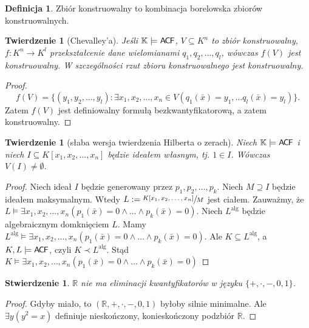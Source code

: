 \documentclass{article}
\newcommand{\R}{\mathbb{R}}
\newcommand{\K}{\mathbb{K}}
\theoremstyle{plain}
\newtheorem{tw}[thm]{Twierdzenie}
\newtheorem{stw}[thm]{Stwierdzenie}
\theoremstyle{definition}
\newtheorem{df}[thm]{Definicja}
\theoremstyle{remark}
\newcommand{\ACF}{\mathsf{A \mkern-2.0mu C \mkern-1.1mu F}}
\begin{document}
\begin{df}
	 Zbiór konstruowalny to kombinacja borelowska zbiorów konstruowalnych.
\end{df}

\begin{tw}[Chevalley'a]
	 Jeśli $\K \models \ACF$, $V \subseteq K^n$ to zbiór konstruowalny,
	 $f \colon K^n \to K^l$ przekształcenie dane wielomianami
	 $q_1, q_2, \ldots, q_l$,
	 wówczas $f(V)$ jest konstruowalny.
	 W szczególności rzut zbioru konstruowalnego jest konstruowalny.
\end{tw}
\begin{proof}
	\[
		f(V) = \{ (y_1, y_2, \ldots, y_l ) \colon \exists x_1, x_2, \ldots, x_n \in V (q_1(\bar{x}) = y_1, \ldots q_l(\bar{x}) = y_l) \}.
	\]
	Zatem $ f(V) $ jest definiowalny formułą bezkwantyfikatorową, a zatem
	konstruowalny.
\end{proof}

\begin{tw}[słaba wersja twierdzenia Hilberta o zerach]
	Niech $\K \models \ACF$ i niech
	$I \subseteq K[x_1, x_2, \ldots, x_n ] $ będzie ideałem własnym, tj.
	$1 \in I$. Wówczas $V(I) \neq \emptyset$.
\end{tw}
\begin{proof}
	Niech ideał $I$ będzie generowany przez $p_1, p_2, \ldots, p_k $.
	Niech $M \supseteq I$ będzie ideałem maksymalnym.
	Wtedy $L := \sfrac{K[x_1, x_2, \ldots, x_n ]}{M} $ jest ciałem.
	Zauważmy, że $L \models \exists x_1, x_2, \ldots, x_n (p_1(\bar{x}) = 0
	\wedge \ldots \wedge p_k(\bar{x}) = 0) $.
	Niech $ L^{\text{alg}} $ będzie algebraicznym domknięciem $ L $.
	Mamy $L^{\text{alg}} \models \exists x_1, x_2, \ldots, x_n
	(p_1(\bar{x}) = 0 \wedge \ldots \wedge p_k(\bar{x}) = 0) $.
	Ale $K \subseteq L^{\text{alg}} $, a $ K , L \models \ACF $, czyli $ K
	\prec L^{\text{alg}} $.
	Stąd $K \models \exists x_1, x_2, \ldots, x_n (p_1(\bar{x}) = 0 \wedge
	\ldots \wedge p_k(\bar{x}) = 0) $
\end{proof}



\begin{stw}
	 $\R$ nie ma eliminacji kwantyfikatorów w języku
	 $\{+, \cdot, -, 0, 1\}$. %
\end{stw}
\begin{proof}
	Gdyby miało, to $ (\R, +, \cdot, -, 0, 1) $ byłoby silnie minimalne.
	Ale $\exists y (y^2 = x) $ definiuje nieskończony, konieskończony
	podzbiór $ \R $.
\end{proof}
\end{document}
